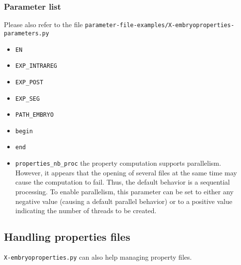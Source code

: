 \subsubsection{Parameter list}

Please also refer to the file
\texttt{parameter-file-examples/X-embryoproperties-parameters.py}

\begin{itemize}
\itemsep -0.5ex
\item \texttt{EN}
\item \texttt{EXP\_INTRAREG}
\item \texttt{EXP\_POST}
\item \texttt{EXP\_SEG}
\item \texttt{PATH\_EMBRYO}
\item \texttt{begin}
\item \texttt{end}
\item \texttt{properties\_nb\_proc} the property computation supports parallelism. However, it appears that the opening of several files at the same time may cause the computation to fail. Thus, the default behavior is a sequential processing. To enable parallelism, this parameter can be set to either any negative value (causing a default parallel behavior) or to a positive value indicating the number of threads to be created.
\end{itemize}

\subsection{Handling properties files}

\texttt{X-embryoproperties.py} can also help managing property files.

